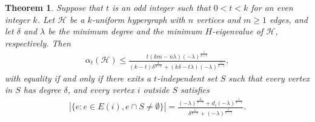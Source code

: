 \documentclass[10pt,a4paper]{amsart}
\newtheorem{thm}{Theorem}
\begin{document}
\begin{thm}\label{t}
Suppose that $t$ is an odd integer such that $0<t<k$ for an even integer $k$. Let $\mathcal{H}$ be a $k$-uniform hypergraph with $n$ vertices and $m\geq1$ edges, and let $\delta$ and $\lambda$ be the minimum degree and the minimum $H$-eigenvalue of $\mathcal{H}$, respectively. Then
\begin{eqnarray*}
{\alpha _t}(\mathcal{H}) \leqslant \frac{{t\left( {km - n \lambda } \right){{\left( { - \lambda } \right)}^{\frac{t}{{k - t}}}}}}{{\left( {k - t} \right){\delta ^{\frac{k}{{k - t}}}} + \left( {k \delta  - t\lambda } \right){{\left( { - \lambda } \right)}^{\frac{t}{{k - t}}}}}},
\end{eqnarray*}
with equality if and only if there exits a $t$-independent set $S$ such that every vertex in $S$ has degree $\delta$, and every vertex $i$ outside $S$ satisfies
\begin{eqnarray*}
\left| {\{ e:e \in E(i),e\cap S\neq\emptyset \} } \right| = \frac{{{{\left( { - \lambda } \right)}^{\frac{k}{{k - t}}}} + {d_i}{{\left( { - \lambda } \right)}^{\frac{t}{{k - t}}}}}}{{{\delta ^{\frac{t}{{k - t}}}} + {{\left( { - \lambda } \right)}^{\frac{t}{{k - t}}}}}}.
\end{eqnarray*}
\end{thm}
\end{document}
